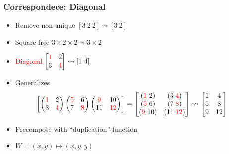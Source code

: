 \documentclass[xetex,mathserif,serif]{beamer}
\newcommand\NB[1]{\textcolor{red}{#1}}
\begin{document}
\begin{frame}
  \frametitle{Correspondece: Diagonal}
  \begin{itemize}%
    \item Remove non-unique \([3\ 2\ 2] \leadsto [3\ 2]\)
    \item Square free \(3\times 2\times 2\leadsto 3 \times 2\)
    \item \NB{Diagonal} \(
      \begin{bmatrix}
        \NB 1 & 2 \\
        3 & \NB 4
      \end{bmatrix} \leadsto [1\ 4]
      \)
    \item Generalizes \[
      \!\!\!\!
      \begin{bmatrix}
        \begin{pmatrix}
          \NB 1 & 2 \\ 3 &\NB  4
        \end{pmatrix}
        \begin{pmatrix}
          \NB 5 & 6 \\ 7 & \NB 8
        \end{pmatrix}
        \begin{pmatrix}
          \NB 9 & 10 \\ 11 & \NB{12}
        \end{pmatrix}
      \end{bmatrix} = 
      \begin{bmatrix}
        (\NB 1\ 2) & (3\ \NB 4) \\
        (\NB 5\ 6) & (7\ \NB 8) \\
        (\NB 9\ 10) & (11\ \NB{12})
      \end{bmatrix} \leadsto
      \begin{bmatrix}
        1 & 4 \\
        5 & 8 \\
        9 & 12 
      \end{bmatrix}
      \]
    \item Precompose with ``duplication'' function
    \item \(W = (x, y) \mapsto (x, y, y)\)
  \end{itemize}
\end{frame}
\end{document}
